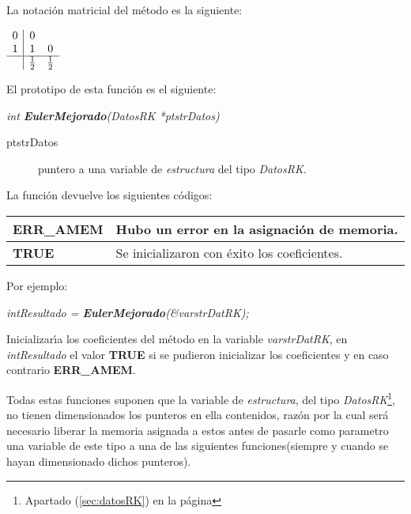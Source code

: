 La notaci\'on matricial del m\'etodo es la siguiente:

\begin{center}
$
\begin{array}{c|cc}
0 & 0 \\
1 & 1 & 0 \\
\hline
 & \frac{1}{2} & \frac{1}{2}
\end{array}
$
\end{center}

El prototipo de esta funci\'on es el siguiente:

\begin{center}
\emph{int \textbf{EulerMejorado}(DatosRK *ptstrDatos)}
\end{center}

\begin{description}
\item[ptstrDatos] puntero a una variable de \emph{estructura} del tipo
\emph{DatosRK}.
\end{description}

La funci\'on devuelve los siguientes c\'odigos:

\begin{center}
\begin{tabular}{|l|l|}
\hline
\textbf{ERR\_AMEM} & Hubo un error en la asignaci\'on de memoria. \\
\hline
\textbf{TRUE} & Se inicializaron con \'exito los coeficientes. \\
\hline
\end{tabular}
\end{center}

Por ejemplo:

\begin{center}
\emph{intResultado = \textbf{EulerMejorado}(\&varstrDatRK);}
\end{center}


Inicializar\'{\i}a los coeficientes del m\'etodo en la variable
\emph{varstrDatRK}, en \emph{intResultado} el valor \textbf{TRUE} si se pudieron
inicializar los coeficientes y en caso contrario \textbf{ERR\_AMEM}.





Todas estas funciones suponen que la variable de \emph{estructura}, del tipo
\emph{DatosRK}\footnote{Apartado (\ref{sec:datosRK}) en la p\'agina 
\pageref{sec:datosRK}}, no tienen dimensionados los punteros en ella 
contenidos, raz\'on por la cual ser\'a necesario liberar la memoria asignada
a estos antes de pasarle como parametro una variable de este tipo a una de
las siguientes funciones(siempre y cuando se hayan dimensionado dichos
punteros).\newline

